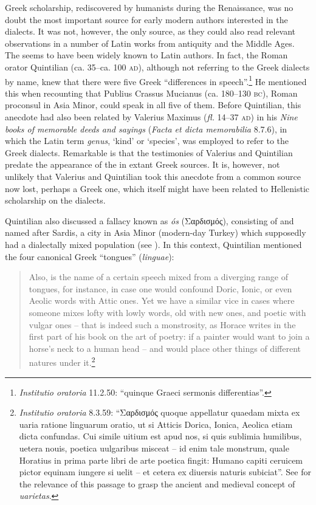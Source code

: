 Greek scholarship, rediscovered by humanists during the Renaissance, was no doubt the most important source for early modern authors interested in the dialects. It was not, however, the only source, as they could also read relevant observations in a number of Latin works from antiquity and the Middle Ages. The  seems to have been widely known to Latin authors. In fact, the Roman orator Quintilian (ca. 35–ca. 100 \textsc{ad}), although not referring to the Greek dialects by name, knew that there were five Greek “differences in speech”.\footnote{{\textit{Institutio oratoria}} {11.2.50: “quinque Graeci sermonis differentias”.}} He mentioned this when recounting that Publius Crassus Mucianus (ca. 180–130 \textsc{bc}), Roman proconsul in Asia Minor, could speak in all five of them. Before Quintilian, this anecdote had also been related by Valerius Maximus (\textit{fl.} 14–37 \textsc{ad}) in his \textit{Nine books of memorable deeds and sayings} (\textit{Facta et dicta memorabilia} 8.7.6), in which the Latin term \textit{genus}, ‘kind’ or ‘species’, was employed to refer to the Greek dialects. Remarkable is that the testimonies of Valerius and Quintilian predate the appearance of the  in extant Greek sources. It is, however, not unlikely that Valerius and Quintilian took this anecdote from a common source now lost, perhaps a Greek one, which itself might have been related to Hellenistic scholarship on the dialects.

Quintilian also discussed a fallacy known as \textit{ós} (Σαρδισμός), consisting of  and named after Sardis, a city in Asia Minor (modern-day Turkey) which supposedly had a dialectally mixed population (see \citealt{Gitner2018}). In this context, Quintilian mentioned the four canonical Greek “tongues” (\textit{linguae}):

\begin{quote}
Also,  is the name of a certain speech mixed from a diverging range of tongues, for instance, in case one would confound Doric, Ionic, or even Aeolic words with Attic ones. Yet we have a similar vice in cases where someone mixes lofty with lowly words, old with new ones, and poetic with vulgar ones – that is indeed such a monstrosity, as Horace writes in the first part of his book on the art of poetry: if a painter would want to join a horse’s neck to a human head – and would place other things of different natures under it.\footnote{\textit{Institutio oratoria} {8.3.59: “Σαρδισμός quoque appellatur quaedam mixta ex uaria ratione linguarum oratio, ut si Atticis Dorica, Ionica, Aeolica etiam dicta confundas. Cui simile uitium est apud nos, si quis sublimia humilibus, uetera nouis, poetica uulgaribus misceat – id enim tale monstrum, quale Horatius in prima parte libri de arte poetica fingit: Humano capiti ceruicem pictor equinam iungere si uelit – et cetera ex diuersis naturis subiciat”. See \citet[46]{Carruthers2009} for the relevance of this passage to grasp the ancient and medieval concept of} {\textit{uarietas}}.}
\end{quote}

